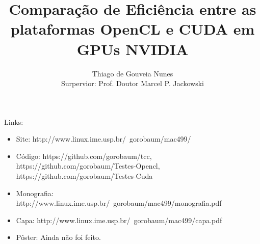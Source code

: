 \documentclass[a4paper,8pt]{article}
\title{Comparação de Eficiência entre as plataformas OpenCL e CUDA em GPUs NVIDIA}
\author{Thiago de Gouveia Nunes \\
        Surpervior: Prof. Doutor Marcel P. Jackowski}
\begin{document}
\maketitle

Links:
\begin{itemize}
  \item Site: http://www.linux.ime.usp.br/~gorobaum/mac499/
  \item Código: https://github.com/gorobaum/tcc, https://github.com/gorobaum/Testes-Opencl, https://github.com/gorobaum/Testes-Cuda
  \item Monografia: http://www.linux.ime.usp.br/~gorobaum/mac499/monografia.pdf
  \item Capa: http://www.linux.ime.usp.br/~gorobaum/mac499/capa.pdf
  \item Pôster: Ainda não foi feito.
\end{itemize}
\end{document}
